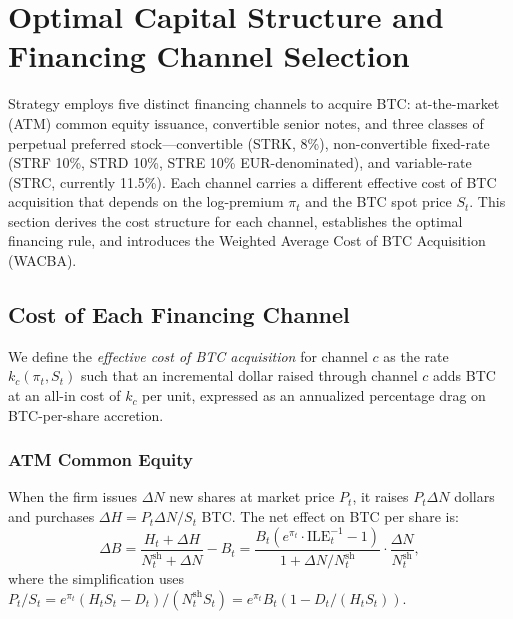 
\section{Optimal Capital Structure and Financing Channel Selection}
\label{sec:optimal_capital}

Strategy employs five distinct financing channels to acquire BTC:
at-the-market (ATM) common equity issuance, convertible senior notes,
and three classes of perpetual preferred stock---convertible (STRK, 8\%),
non-convertible fixed-rate (STRF 10\%, STRD 10\%, STRE 10\% EUR-denominated),
and variable-rate (STRC, currently 11.5\%).
Each channel carries a different effective cost of BTC acquisition
that depends on the log-premium $\pi_t$ and the BTC spot price $S_t$.
This section derives the cost structure for each channel, establishes
the optimal financing rule, and introduces the Weighted Average Cost
of BTC Acquisition (WACBA).

\subsection{Cost of Each Financing Channel}

We define the \emph{effective cost of BTC acquisition} for channel $c$
as the rate $k_c(\pi_t, S_t)$ such that an incremental dollar raised
through channel $c$ adds BTC at an all-in cost of $k_c$ per unit,
expressed as an annualized percentage drag on BTC-per-share accretion.

\subsubsection{ATM Common Equity}

When the firm issues $\Delta N$ new shares at market price $P_t$,
it raises $P_t \Delta N$ dollars and purchases
$\Delta H = P_t \Delta N / S_t$ BTC.
The net effect on BTC per share is:
\begin{equation}
  \Delta B = \frac{H_t + \Delta H}{N_t^{\mathrm{sh}} + \Delta N} - B_t
  = \frac{B_t(e^{\pi_t} \cdot \text{ILE}_t^{-1} - 1)}{1 + \Delta N / N_t^{\mathrm{sh}}}\cdot\frac{\Delta N}{N_t^{\mathrm{sh}}},
  \label{eq:atm_dilution}
\end{equation}
where the simplification uses
$P_t / S_t = e^{\pi_t}(H_t S_t - D_t) / (N_t^{\mathrm{sh}} S_t)
= e^{\pi_t} B_t (1 - D_t / (H_t S_t))$.

